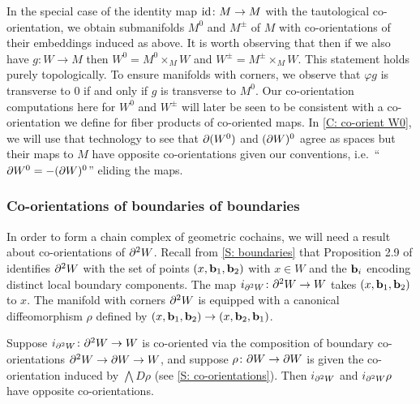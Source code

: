 \begin{example}
	In the special case of the identity map $\mathrm{id} \colon M \to M$ with the tautological co-orientation, we obtain submanifolds $M^0$ and $M^{\pm}$ of $M$ with co-orientations of their embeddings induced as above.
	It is worth observing that then if we also have $g \colon W \to M$ then $W^0 = M^0 \times_M W$ and $W^{\pm} = M^{\pm} \times_M W$.
	This statement holds purely topologically.
	To ensure manifolds with corners, we observe that $\varphi g$ is transverse to $0$ if and only if $g$ is transverse to $M^0$.
	Our co-orientation computations here for $W^0$ and $W^\pm$ will later be seen to be consistent with a co-orientation we define for fiber products of co-oriented maps.
	In \cref{C: co-orient W0}, we will use that technology to see that $\partial (W^0)$ and $(\partial W)^0$ agree as spaces but their maps to $M$ have opposite co-orientations given our conventions, i.e.\ ``$\partial W^0 = -(\partial W)^0$'' eliding the maps.
\end{example}

\begin{comment}
	\red{TO DO SOMEWHERE: It will be convenient to show that $g \colon W^0 \to M$ with this co-orientation is the pullback of $M^0 \into M$ (co-oriented as defined here) and $g \colon W \to M$ and similarly for $g \colon W^\pm \to M$.
		Also need to rewrite things in other places as $M^0$, $M^\pm$, etc instead of always writing $\varphi^{-1}((\infty,0])$ etc.
		Also need to show that $\bd W^0 = -(\bd W)^0$, which should follow from the Leibniz rule and the first thing the previous sentence.}
\end{comment}

\subsubsection{Co-orientations of boundaries of boundaries}

In order to form a chain complex of geometric cochains, we will need a result about co-orientations of $\partial^2 W$.
Recall from \cref{S: boundaries} that Proposition 2.9 of \cite{Joy12} identifies $\partial^2 W$ with the set of points $(x,\mathbf{b}_1,\mathbf{b}_2)$ with $x \in W$ and the $\mathbf{b}_i$ encoding distinct local boundary components.
The map $i_{\partial^2 W} \colon \partial^2 W \to W$ takes $(x,\mathbf{b}_1,\mathbf{b}_2)$ to $x$.
The manifold with corners $\partial^2 W$ is equipped with a canonical diffeomorphism $\rho$ defined by $(x,\mathbf{b}_1,\mathbf{b}_2) \to (x,\mathbf{b}_2,\mathbf{b}_1)$.

\begin{lemma}\label{L: boundary2}
	Suppose $i_{\partial^2 W} \colon \partial^2 W \to W$ is co-oriented via the composition of boundary co-orientations $\partial^2 W \to \partial W \to W$, and suppose $\rho \colon \partial W \to \partial W$ is given the co-orientation induced by $\bigwedge D\rho$ (see \cref{S: co-orientations}).
	Then $i_{\partial^2 W}$ and $i_{\partial^2 W}\rho$ have opposite co-orientations.
\end{lemma}

